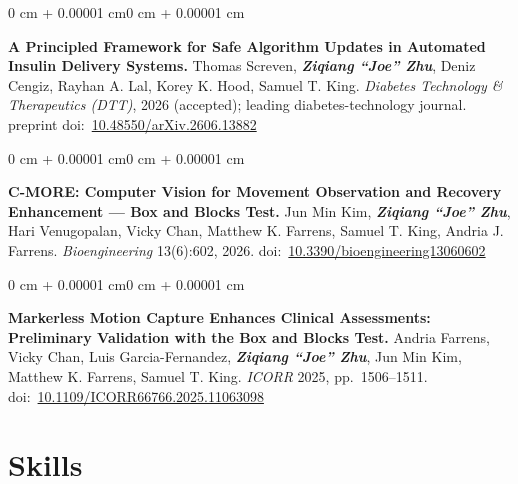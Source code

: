 \documentclass[10pt, letterpaper]{article}
\newenvironment{onecolentry}{
    \begin{adjustwidth}{0 cm + 0.00001 cm}{0 cm + 0.00001 cm}
}{
    \end{adjustwidth}
}
\begin{document}
        \vspace{0.10 cm}

        \begin{onecolentry}
            \textbf{A Principled Framework for Safe Algorithm Updates in Automated Insulin Delivery
            Systems.} Thomas Screven, \textbf{\textit{Ziqiang ``Joe'' Zhu}}, Deniz Cengiz, Rayhan A. Lal,
            Korey K. Hood, Samuel T. King. \textit{Diabetes Technology \& Therapeutics (DTT)}, 2026 (accepted); leading diabetes-technology journal.
            preprint doi:~\href{https://doi.org/10.48550/arXiv.2606.13882}{10.48550/arXiv.2606.13882}
            \label{pub:aid-safe-updates}
        \end{onecolentry}

        \vspace{0.10 cm}

        \begin{onecolentry}
            \textbf{C-MORE: Computer Vision for Movement Observation and Recovery Enhancement --- Box
            and Blocks Test.} Jun Min Kim, \textbf{\textit{Ziqiang ``Joe'' Zhu}}, Hari Venugopalan, Vicky Chan,
            Matthew K. Farrens, Samuel T. King, Andria J. Farrens.
            \textit{Bioengineering} 13(6):602, 2026.
            doi:~\href{https://doi.org/10.3390/bioengineering13060602}{10.3390/bioengineering13060602}
            \label{pub:cmore}
        \end{onecolentry}

        \vspace{0.10 cm}

        \begin{onecolentry}
            \textbf{Markerless Motion Capture Enhances Clinical Assessments: Preliminary Validation
            with the Box and Blocks Test.} Andria Farrens, Vicky Chan, Luis Garcia-Fernandez,
            \textbf{\textit{Ziqiang ``Joe'' Zhu}}, Jun Min Kim, Matthew K. Farrens, Samuel T. King.
            \textit{ICORR} 2025, pp.~1506--1511.
            doi:~\href{https://doi.org/10.1109/ICORR66766.2025.11063098}{10.1109/ICORR66766.2025.11063098}
            \label{pub:markerless-motion-capture}
        \end{onecolentry}

    \section{Skills}
\end{document}
